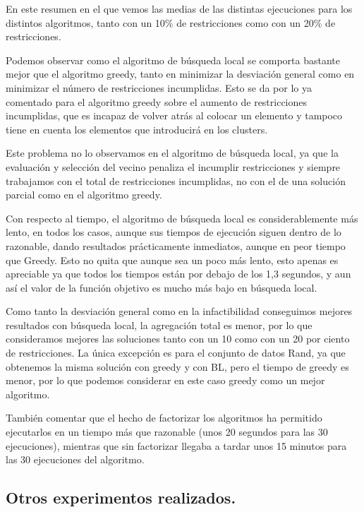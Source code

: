 \documentclass[12pt, spanish]{article}
\begin{document}
En este resumen en el que vemos las medias de las distintas ejecuciones para los distintos algoritmos, tanto con un 10\% de restricciones como con un 20\% de restricciones.

Podemos observar como el algoritmo de búsqueda local se comporta bastante mejor que el algoritmo greedy, tanto en minimizar la desviación general como en minimizar el número de restricciones incumplidas. Esto se da por lo ya comentado para el algoritmo greedy sobre el aumento de restricciones incumplidas, que es incapaz de volver atrás al colocar un elemento y tampoco tiene en cuenta los elementos que introducirá en los clusters.

Este problema no lo observamos en el algoritmo de búsqueda local, ya que la evaluación y selección del vecino penaliza el incumplir restricciones y siempre trabajamos con el total de restricciones incumplidas, no con el de una solución parcial como en el algoritmo greedy.

Con respecto al tiempo, el algoritmo de búsqueda local es considerablemente más lento, en todos los casos, aunque sus tiempos de ejecución siguen dentro de lo razonable, dando resultados prácticamente inmediatos, aunque en peor tiempo que Greedy. Esto no quita que aunque sea un poco más lento, esto apenas es apreciable ya que todos los tiempos están por debajo de los 1,3 segundos, y aun así el valor de la función objetivo es mucho más bajo en búsqueda local.

Como tanto la desviación general como en la infactibilidad conseguimos mejores resultados con búsqueda local, la agregación total es menor, por lo que consideramos mejores las soluciones tanto con un 10 como con un 20 por ciento de restricciones. La única excepción es para el conjunto de datos Rand, ya que obtenemos la misma solución con greedy y con BL, pero el tiempo de greedy es menor, por lo que podemos considerar en este caso greedy como un mejor algoritmo.

También comentar que el hecho de factorizar los algoritmos ha permitido ejecutarlos en un tiempo más que razonable (unos 20 segundos para las 30 ejecuciones), mientras que sin factorizar llegaba a tardar unos 15 minutos para las 30 ejecuciones del algoritmo.


\newpage

\subsection{Otros experimentos realizados.}
\end{document}
